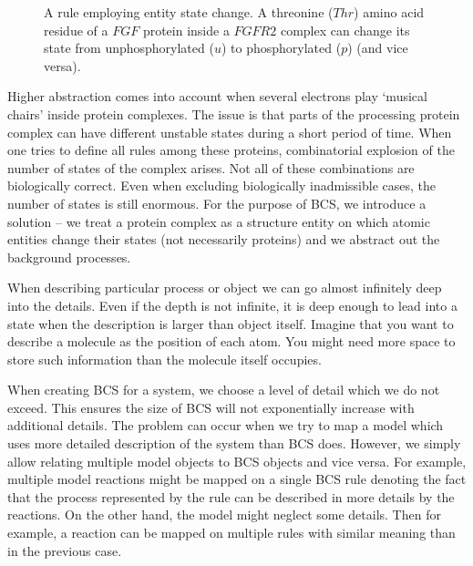 \documentclass[12pt, twoside]{fithesis2} %
\begin{document}
\begin{figure}[!h]
\begin{center}
\end{center}
\caption{A rule employing entity state change. A threonine ($Thr$) amino acid residue of a $FGF$ protein inside a $FGFR2$ complex can change its state from unphosphorylated ($u$) to phosphorylated ($p$) (and vice versa).}\label{rule_example}
\end{figure}

Higher abstraction comes into account when several electrons play `musical chairs' inside protein complexes. The issue is that parts of the processing protein complex can have different unstable states during a short period of time. When one tries to define all rules among these proteins, combinatorial explosion of the number of states of the complex arises. Not all of these combinations are biologically correct. Even when excluding biologically inadmissible cases, the number of states is still enormous. For the purpose of BCS, we introduce a solution -- we treat a protein complex as a structure entity on which atomic entities change their states (not necessarily proteins) and we abstract out the background processes.

When describing particular process or object we can go almost infinitely deep into the details. Even if the depth is not infinite, it is deep enough to lead into a state when the description is larger than object itself. Imagine that you want to describe a molecule as the position of each atom. You might need more space to store such information than the molecule itself occupies.

When creating BCS for a system, we choose a level of detail which we do not exceed. This ensures the size of BCS will not exponentially increase with additional details. The problem can occur when we try to map a model which uses more detailed description of the system than BCS does. However, we simply allow relating multiple model objects to BCS objects and vice versa. For example, multiple model reactions might be mapped on a single BCS rule denoting the fact that the process represented by the rule can be described in more details by the reactions. On the other hand, the model might neglect some details. Then for example, a reaction can be mapped on multiple rules with similar meaning than in the previous case.
\end{document}

